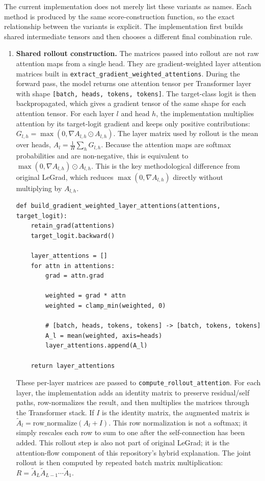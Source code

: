 \documentclass[11pt]{article}
\begin{document}
The current implementation does not merely list these variants as names. Each
method is produced by the same score-construction function, so the exact
relationship between the variants is explicit. The implementation first builds
shared intermediate tensors and then chooses a different final combination rule.

\begin{enumerate}
  \item \textbf{Shared rollout construction.} The matrices passed into rollout
  are not raw attention maps from a single head. They are gradient-weighted
  layer attention matrices built in \texttt{extract\_gradient\_weighted\_attentions}.
  During the forward pass, the model returns one attention tensor per
  Transformer layer with shape \texttt{[batch, heads, tokens, tokens]}. The
  target-class logit is then backpropagated, which gives a gradient tensor of
  the same shape for each attention tensor. For each layer $l$ and head $h$,
  the implementation multiplies attention by its target-logit gradient and
  keeps only positive contributions:
  $G_{l,h} = \max(0, \nabla A_{l,h} \odot A_{l,h})$. The layer matrix used by
  rollout is the mean over heads, $A_l = \frac{1}{H}\sum_h G_{l,h}$.
  Because the attention maps are softmax probabilities and are non-negative,
  this is equivalent to $\max(0, \nabla A_{l,h}) \odot A_{l,h}$. This is the
  key methodological difference from original LeGrad, which reduces
  $\max(0, \nabla A_{l,h})$ directly without multiplying by $A_{l,h}$.

\begin{verbatim}
def build_gradient_weighted_layer_attentions(attentions, target_logit):
    retain_grad(attentions)
    target_logit.backward()

    layer_attentions = []
    for attn in attentions:
        grad = attn.grad

        weighted = grad * attn
        weighted = clamp_min(weighted, 0)

        # [batch, heads, tokens, tokens] -> [batch, tokens, tokens]
        A_l = mean(weighted, axis=heads)
        layer_attentions.append(A_l)

    return layer_attentions
\end{verbatim}

  These per-layer matrices are passed to \texttt{compute\_rollout\_attention}.
  For each layer, the implementation adds an identity matrix to preserve
  residual/self paths, row-normalizes the result, and then multiplies the
  matrices through the Transformer stack. If $I$ is the identity matrix, the
  augmented matrix is $\tilde{A}_l = \mathrm{row\_normalize}(A_l + I)$. This
  row normalization is not a softmax; it simply rescales each row to sum to
  one after the self-connection has been added. This rollout step is also not
  part of original LeGrad; it is the attention-flow component of this
  repository's hybrid explanation. The joint rollout is then
  computed by repeated batch matrix multiplication:
  $R = \tilde{A}_L \tilde{A}_{L-1} \cdots \tilde{A}_1$.


\end{enumerate}
\end{document}
